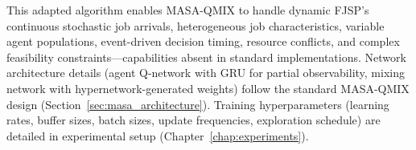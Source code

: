 \begin{algorithm}[htbp]
\;

\end{algorithm}

This adapted algorithm enables MASA-QMIX to handle dynamic FJSP's continuous stochastic job arrivals, heterogeneous job characteristics, variable agent populations, event-driven decision timing, resource conflicts, and complex feasibility constraints—capabilities absent in standard implementations. Network architecture details (agent Q-network with GRU for partial observability, mixing network with hypernetwork-generated weights) follow the standard MASA-QMIX design (Section~\ref{sec:masa_architecture}). Training hyperparameters (learning rates, buffer sizes, batch sizes, update frequencies, exploration schedule) are detailed in experimental setup (Chapter~\ref{chap:experiments}).
